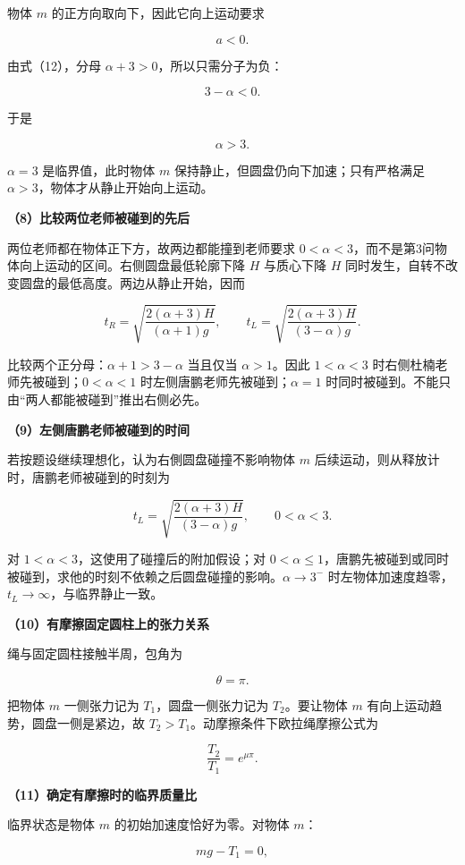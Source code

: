 \documentclass[12pt,a4paper,UTF8]{ctexart}
\begin{document}
物体 \(m\) 的正方向取向下，因此它向上运动要求

\[
a<0.
\]

由式（12），分母 \(\alpha+3>0\)，所以只需分子为负：

\[
3-\alpha<0.
\]

于是

\[
\boxed{\alpha>3}.
\tag{17}
\]

\(\alpha=3\) 是临界值，此时物体 \(m\)
保持静止，但圆盘仍向下加速；只有严格满足
\(\alpha>3\)，物体才从静止开始向上运动。

\textbf{（8）比较两位老师被碰到的先后}

两位老师都在物体正下方，故两边都能撞到老师要求
\(0<\alpha<3\)，而不是第3问物体向上运动的区间。右侧圆盘最低轮廓下降
\(H\) 与质心下降 \(H\)
同时发生，自转不改变圆盘的最低高度。两边从静止开始，因而

\[t_R=\sqrt{\frac{2(\alpha+3)H}{(\alpha+1)g}},\qquad t_L=\sqrt{\frac{2(\alpha+3)H}{(3-\alpha)g}}.\]

比较两个正分母：\(\alpha+1>3-\alpha\) 当且仅当 \(\alpha>1\)。因此
\(1<\alpha<3\) 时右侧杜楠老师先被碰到；\(0<\alpha<1\)
时左侧唐鹏老师先被碰到；\(\alpha=1\)
时同时被碰到。不能只由``两人都能被碰到''推出右侧必先。

\textbf{（9）左侧唐鹏老师被碰到的时间}

若按题设继续理想化，认为右側圆盘碰撞不影响物体 \(m\)
后续运动，则从释放计时，唐鹏老师被碰到的时刻为

\[\boxed{t_L=\sqrt{\frac{2(\alpha+3)H}{(3-\alpha)g}}},\qquad0<\alpha<3.\]

对 \(1<\alpha<3\)，这使用了碰撞后的附加假设；对
\(0<\alpha\le1\)，唐鹏先被碰到或同时被碰到，求他的时刻不依赖之后圆盘碰撞的影响。\(\alpha\to3^-\)
时左物体加速度趋零，\(t_L\to\infty\)，与临界静止一致。

\textbf{（10）有摩擦固定圆柱上的张力关系}

绳与固定圆柱接触半周，包角为

\[
\theta=\pi.
\tag{23}
\]

把物体 \(m\) 一侧张力记为 \(T_1\)，圆盘一侧张力记为 \(T_2\)。要让物体
\(m\) 有向上运动趋势，圆盘一侧是紧边，故
\(T_2>T_1\)。动摩擦条件下欧拉绳摩擦公式为

\[
\boxed{\frac{T_2}{T_1}=e^{\mu\pi}}.
\tag{24}
\]

\textbf{（11）确定有摩擦时的临界质量比}

临界状态是物体 \(m\) 的初始加速度恰好为零。对物体 \(m\)：

\[
mg-T_1=0,
\]
\end{document}
